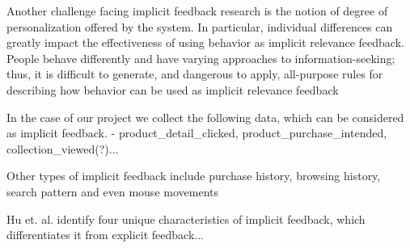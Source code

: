 Another challenge facing implicit feedback research is the notion of degree of
personalization offered by the system. In particular, individual differences can greatly
impact the effectiveness of using behavior as implicit relevance feedback. People behave
differently and have varying approaches to information-seeking; thus, it is difficult to
generate, and dangerous to apply, all-purpose rules for describing how behavior can be
used as implicit relevance feedback


In the case of our project we collect the following data, which can be
considered as implicit feedback.  - product\_detail\_clicked,
product\_purchase\_intended, collection\_viewed(?)...

Other types of implicit feedback include purchase history, browsing
history, search pattern and even mouse movements

Hu et. al. \cite{Hu2008} identify four unique characteristics of implicit
feedback, which differentiates it from explicit feedback...

